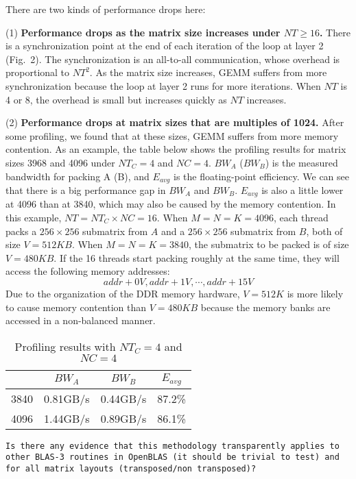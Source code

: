 \documentclass[]{article}
\begin{document}
There are two kinds of performance drops here:

(1) {\bf Performance drops as the matrix size increases 
under $NT \ge 16$.}
There is a synchronization point at the end of each iteration
of the loop at layer 2 (Fig.~2).
The synchronization is an all-to-all 
communication, whose overhead is proportional to $NT^2$.
As the matrix size increases, GEMM suffers
from more synchronization because
the loop at layer 2 runs for more iterations.
When $NT$ is 4 or 8, the overhead is small but
increases quickly as $NT$ increases.

(2) {\bf Performance drops at matrix sizes that are
multiples of 1024.}
After some  profiling, we found that at these sizes,
GEMM suffers from more memory contention.
As an example, the table below shows the profiling results
for matrix sizes 3968 and 4096
under $NT_C=4$ and $NC=4$.
$BW_{A}$ ($BW_{B}$) is the measured bandwidth for 
packing A (B), and
$E_{avg}$ is the floating-point efficiency.
We can see that there is a big performance gap
in $BW_{A}$ and $BW_{B}$.
$E_{avg}$ is also a little lower at 4096 than at 3840,
which may also be caused by the memory contention.
In this example, $NT=NT_C \times NC=16$.
When $M=N=K=4096$, each thread packs a $256 \times 256$ submatrix
from $A$ and a $256 \times 256$ submatrix from $B$,
both of size $V=512KB$.
When $M=N=K=3840$, the submatrix to be packed is 
of size $V=480KB$.
If the 16 threads start packing roughly at the same time,
they will access the following memory addresses:
$$addr+0V, addr+1V, \cdots, addr+15V$$
Due to the organization of the DDR memory hardware,
$V=512K$ is more likely to cause memory contention than $V=480KB$
because the memory banks are accessed in a non-balanced manner.

\begin{table}[h]
  \centering
  \caption{Profiling results with $NT_C=4$ and $NC=4$}
  \vspace{1em}
  \begin{tabular}{cccc}
    \toprule
         & $BW_A$   & $BW_B$   & $E_{avg}$\\
    \midrule
    3840 & 0.81GB/s & 0.44GB/s & 87.2\%   \\
    4096 & 1.44GB/s & 0.89GB/s & 86.1\%   \\
    \bottomrule
  \end{tabular}
\end{table}

\begin{verbatim}
Is there any evidence that this methodology transparently applies to 
other BLAS-3 routines in OpenBLAS (it should be trivial to test) and
for all matrix layouts (transposed/non transposed)?
\end{verbatim}
\end{document}
